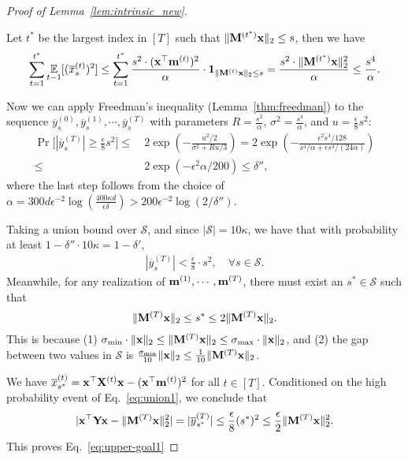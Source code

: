 \begin{proof}[Proof of Lemma~\ref{lem:intrinsic_new}]
\begin{itemize}
Let $t^*$ be the largest index in $[T]$ such that $\|\mathbf{M}^{(t^*)} \mathbf{x}\|_2 \leq s$, then we have
\begin{align*}
\sum_{t=1}^{t^{*}} \operatorname*{{\mathbb{E}}}_{t-1}[(\overline{x}_s^{(t)})^2] \leq \sum_{t=1}^{t^{*}} \frac{s^2 \cdot (\mathbf{x}^{\top} \mathbf{m}^{(t)})^2}{\alpha} \cdot \mathbf{1}_{\|\mathbf{M}^{(t)} \mathbf{x}\|_2 \leq s} = \frac{s^2 \cdot \|\mathbf{M}^{(t^*)} \mathbf{x}\|_2^2}{\alpha} \leq \frac{s^4}{\alpha}.
\end{align*}
\end{itemize}


Now we can apply Freedman's inequality (Lemma~\ref{thm:freedman}) to the sequence $\overline{y}_s^{(0)}, \overline{y}_s^{(1)}, \cdots, \overline{y}_s^{(T)}$ with parameters $R = \frac{s^2}{\alpha}$, $\sigma^2 = \frac{s^4}{\alpha}$, and $u = \frac{\epsilon}{8} s^2$:
\begin{align*}
\Pr\Big[|\overline{y}_s^{(T)}| \geq  \frac{\epsilon}{8} s^2\Big] \leq &~ 2 \exp\left(-\frac{u^2/2}{\sigma^2 + Ru / 3}\right) = 2 \exp\left(-\frac{\epsilon^2 s^4/128}{s^4/\alpha + \epsilon s^4 / (24 \alpha)}\right)\\
\leq &~ 2 \exp\left(-\epsilon^2 \alpha / 200\right) \leq \delta'',
\end{align*}
where the last step follows from the choice of $\alpha = 300 d \epsilon^{-2} \log(\frac{400 \kappa d}{\epsilon \delta}) > 200 \epsilon^{-2} \log(2/\delta'')$.

Taking a union bound over $\mathcal{S}$, and since $|\mathcal{S}| = 10 \kappa$, we have that with probability at least $1 - \delta'' \cdot 10 \kappa = 1 - \delta'$, 
\begin{align}
|\overline{y}_s^{(T)}| < \frac{\epsilon}{8}\cdot s^2, \quad  \forall s \in \mathcal{S}.
\label{eq:union1}
\end{align}
Meanwhile, for any realization of $\mathbf{m}^{(1)}, \cdots, \mathbf{m}^{(T)}$, there must exist an $s^* \in \mathcal{S}$ such that 
\[
\|\mathbf{M}^{(T)} \mathbf{x}\|_2 \leq s^* \leq 2 \|\mathbf{M}^{(T)} \mathbf{x}\|_2.
\]
This is because (1) $\sigma_{\min} \cdot \|\mathbf{x}\|_2 \leq \|\mathbf{M}^{(T)} \mathbf{x}\|_2 \leq \sigma_{\max} \cdot \|\mathbf{x}\|_2$,  
and (2) the gap between two values in $\mathcal{S}$ is $\frac{\sigma_{\min}}{10} \|\mathbf{x}\|_2 \leq \frac{1}{10} \|\mathbf{M}^{(T)} \mathbf{x}\|_2$. 

We have $\overline{x}_{s^*}^{(t)} = \mathbf{x}^{\top} \mathbf{X}^{(t)} \mathbf{x} - (\mathbf{x}^{\top} \mathbf{m}^{(t)})^2$ for all $t \in [T]$. 
Conditioned on the high probability event of Eq.~\eqref{eq:union1}, we conclude that
\[
|\mathbf{x}^{\top} \mathbf{Y} \mathbf{x} - \|\mathbf{M}^{(T)} \mathbf{x}\|_2^2 | = |\overline{y}_{s^*}^{(T)}| \leq \frac{\epsilon}{8} (s^*)^2 \leq \frac{\epsilon}{2} \|\mathbf{M}^{(T)} \mathbf{x}\|_2^2.
\]
This proves Eq.~\eqref{eq:upper-goal1}


\end{proof}
